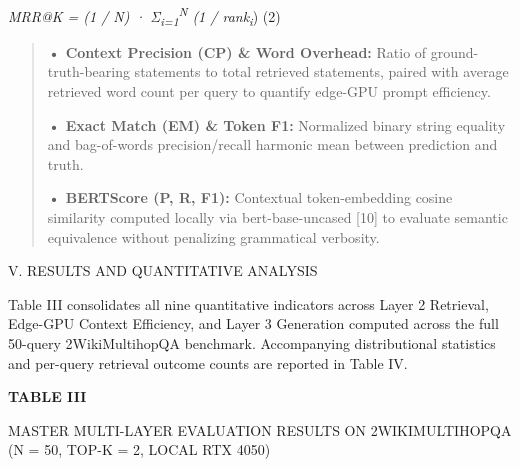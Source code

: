 \emph{MRR@K = (1 / N) · Σ\textsubscript{i=1}\textsuperscript{N} (1 /
rank\textsubscript{i}}) (2)

\begin{quote}
\textbf{• Context Precision (CP) \& Word Overhead:} Ratio of
ground-truth-bearing statements to total retrieved statements, paired
with average retrieved word count per query to quantify edge-GPU prompt
efficiency.

\textbf{• Exact Match (EM) \& Token F1:} Normalized binary string
equality and bag-of-words precision/recall harmonic mean between
prediction and truth.

\textbf{• BERTScore (P, R, F1):} Contextual token-embedding cosine
similarity computed locally via bert-base-uncased {[}10{]} to evaluate
semantic equivalence without penalizing grammatical verbosity.
\end{quote}

\textsc{V. RESULTS AND QUANTITATIVE ANALYSIS}

Table III consolidates all nine quantitative indicators across Layer 2
Retrieval, Edge-GPU Context Efficiency, and Layer 3 Generation computed
across the full 50-query 2WikiMultihopQA benchmark. Accompanying
distributional statistics and per-query retrieval outcome counts are
reported in Table IV.

\textbf{TABLE III}

\textsc{MASTER MULTI-LAYER EVALUATION RESULTS ON 2WIKIMULTIHOPQA (N =
50, TOP-K = 2, LOCAL RTX 4050)}

